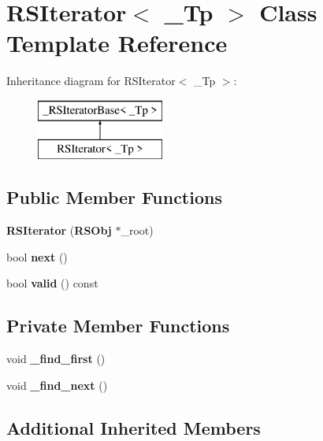 \section{R\-S\-Iterator$<$ \-\_\-\-Tp $>$ Class Template Reference}
\label{classRSIterator}
Inheritance diagram for R\-S\-Iterator$<$ \-\_\-\-Tp $>$\-:\begin{figure}[H]
\begin{center}
\leavevmode
\includegraphics[height=2.000000cm]{classRSIterator}
\end{center}
\end{figure}
\subsection*{Public Member Functions}
\begin{DoxyCompactItemize}
\item 
{\bfseries R\-S\-Iterator} ({\bf R\-S\-Obj} $\ast$\-\_\-root)\label{classRSIterator_a45c2bba6dbcadf418450aa27ac07cc66}

\item 
bool {\bfseries next} ()\label{classRSIterator_a218c6e684151e411d51be7f09ef78cd1}

\item 
bool {\bfseries valid} () const \label{classRSIterator_a0a764a811e825fc874152ba072abb6bf}

\end{DoxyCompactItemize}
\subsection*{Private Member Functions}
\begin{DoxyCompactItemize}
\item 
void {\bfseries \-\_\-find\-\_\-first} ()\label{classRSIterator_a0eecc732b9c10c1b66cfe6254eac0a62}

\item 
void {\bfseries \-\_\-find\-\_\-next} ()\label{classRSIterator_af89e993afce640fe59ed3a1d34cd35d5}

\end{DoxyCompactItemize}
\subsection*{Additional Inherited Members}


